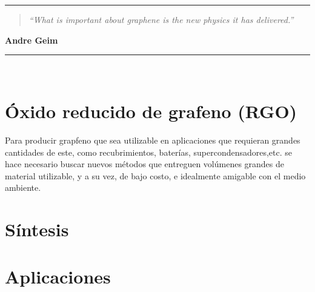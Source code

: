 \noindent
\rule{\linewidth}{1 pt}
\begin{flushright}
	\begin{quotation}
		\small{
			\textit{``What is important about graphene is the new physics it has delivered.''}}
	\end{quotation}
	\bf{Andre Geim}
\end{flushright}
\noindent
\rule{\linewidth}{1 pt}\\
\vfill

\section{Óxido reducido de grafeno (RGO)}
Para producir grapfeno que sea utilizable en aplicaciones que requieran grandes cantidades de este, como recubrimientos, baterías, supercondensadores,etc. se hace necesario buscar nuevos métodos que entreguen volúmenes grandes de material utilizable, y a su vez, de bajo costo, e idealmente amigable con el medio ambiente. 
\section{Síntesis}

\section{Aplicaciones}
